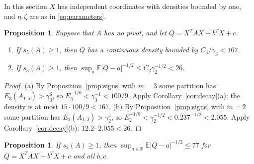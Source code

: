 \documentclass[11pt]{amsart}
\numberwithin{equation}{section}
\newtheorem{proposition}[theorem]{Proposition}
\theoremstyle{definition}
\theoremstyle{remark}
\newcommand{\R}{\mathbb R}
\newcommand{\E}{\mathbb E}
\newcommand{\1}{\mathbf 1}
\newcommand{\abs}[1]{\lvert #1\rvert}
\begin{document}
In this section $X$ has independent coordinates with densities bounded by one, and $\eta,\zeta$ are as in \eqref{eq:parameters}.

\begin{proposition}\label{prop:nopivot}
Suppose that $A$ has no pivot, and let $Q=X^TAX+b^TX+c$.
\begin{enumerate}
\item[(a)] If $s_5(A)\ge1$, then $Q$ has a continuous density bounded by $C_3/\gamma_3<167$.
\item[(b)] If $s_3(A)\ge1$, then $\sup_a\E\abs{Q-a}^{-1/2}\le C_2\gamma_2^{-1/2}<26$.
\end{enumerate}
\end{proposition}

\begin{proof}
(a) By Proposition~\ref{prop:signs} with $m=3$ some partition has $E_3(A_{I,J})>\gamma_3^6$, so $E_3^{-1/6}<\gamma_3^{-1}<100/9$. Apply Corollary~\ref{cor:decay}(a): the density is at most $15\cdot100/9<167$. (b) By Proposition~\ref{prop:signs} with $m=2$ some partition has $E_2(A_{I,J})>\gamma_2^4$, so $E_2^{-1/8}<\gamma_2^{-1/2}<0.237^{-1/2}<2.055$. Apply Corollary~\ref{cor:decay}(b): $12.2\cdot2.055<26$.
\end{proof}

\begin{proposition}\label{prop:halfpotential}
If $s_3(A)\ge1$, then $\sup_{a\in\R}\E\abs{Q-a}^{-1/2}\le77$ for $Q=X^TAX+b^TX+c$ and all $b,c$.
\end{proposition}
\end{document}
